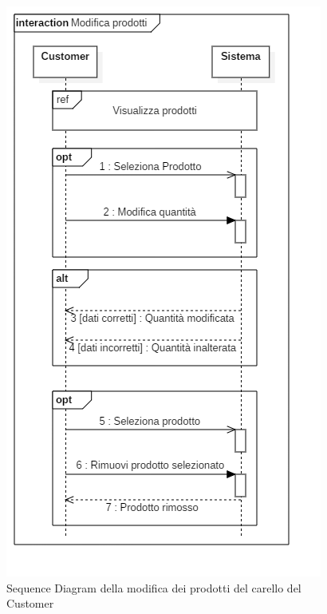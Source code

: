 \documentclass[12pt]{article}
\begin{document}
\begin{figure}[h!]
	\begin{center}
 	 	\includegraphics[keepaspectratio]{media/diagrams/sequence/modifica_prodotti.png}
  	 	 \caption{Sequence Diagram della modifica dei prodotti del carello del Customer}
	\end{center}
\end{figure}
\end{document}
